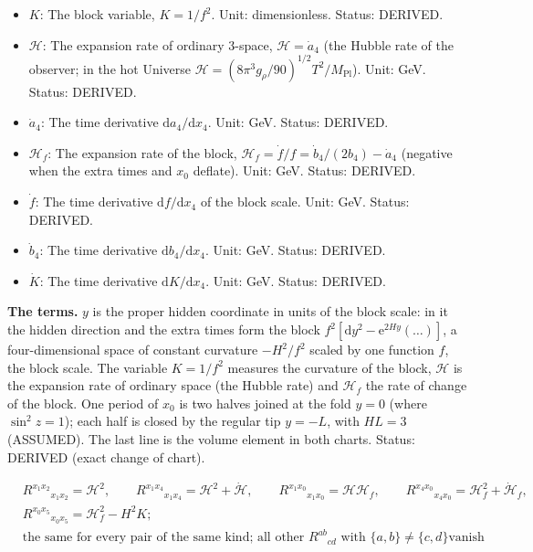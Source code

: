 \documentclass[
  10pt,
]{article}
\begin{document}
\begin{itemize}
\item
  \(K\): The block variable, \(K = 1/f^2\). Unit: dimensionless. Status:
  DERIVED.
\item
  \(\mathcal{H}\): The expansion rate of ordinary 3-space,
  \(\mathcal{H} = \dot a_4\) (the Hubble rate of the observer; in the
  hot Universe
  \(\mathcal{H} = (8\pi^3g_\rho/90)^{1/2}T^2/M_{\mathrm{Pl}}\)). Unit:
  GeV. Status: DERIVED.
\item
  \(\dot a_4\): The time derivative \(\mathrm{d}a_4/\mathrm{d}x_4\).
  Unit: GeV. Status: DERIVED.
\item
  \(\mathcal{H}_f\): The expansion rate of the block,
  \(\mathcal{H}_f = \dot f/f = \dot b_4/(2b_4) - \dot a_4\) (negative
  when the extra times and \(x_0\) deflate). Unit: GeV. Status: DERIVED.
\item
  \(\dot f\): The time derivative \(\mathrm{d}f/\mathrm{d}x_4\) of the
  block scale. Unit: GeV. Status: DERIVED.
\item
  \(\dot b_4\): The time derivative \(\mathrm{d}b_4/\mathrm{d}x_4\).
  Unit: GeV. Status: DERIVED.
\item
  \(\dot K\): The time derivative \(\mathrm{d}K/\mathrm{d}x_4\). Unit:
  GeV. Status: DERIVED.
\end{itemize}

\textbf{The terms.} \(y\) is the proper hidden coordinate in units of
the block scale: in it the hidden direction and the extra times form the
block \(f^2[\mathrm{d}y^2 - \mathrm{e}^{2Hy}(\dots)]\), a
four-dimensional space of constant curvature \(-H^2/f^2\) scaled by one
function \(f\), the block scale. The variable \(K = 1/f^2\) measures the
curvature of the block, \(\mathcal{H}\) is the expansion rate of
ordinary space (the Hubble rate) and \(\mathcal{H}_f\) the rate of
change of the block. One period of \(x_0\) is two halves joined at the
fold \(y = 0\) (where \(\sin^2z = 1\)); each half is closed by the
regular tip \(y = -L\), with \(HL = 3\) (ASSUMED). The last line is the
volume element in both charts. Status: DERIVED (exact change of chart).

\[
\begin{aligned}
&R^{x_1x_2}{}_{x_1x_2} = \mathcal{H}^2,\qquad R^{x_1x_4}{}_{x_1x_4} = \mathcal{H}^2 + \dot{\mathcal{H}},\qquad
 R^{x_1x_0}{}_{x_1x_0} = \mathcal{H}\mathcal{H}_f,\qquad R^{x_4x_0}{}_{x_4x_0} = \mathcal{H}_f^2 +
 \dot{\mathcal{H}}_f,\\
&R^{x_0x_5}{}_{x_0x_5} = \mathcal{H}_f^2 - H^2K;\\
&\text{the same for every pair of the same kind; all other $R^{ab}{}_{cd}$ with $\{a, b\} \ne \{c, d\}$
 vanish}
\end{aligned} \tag{FE-33}
\]
\end{document}
